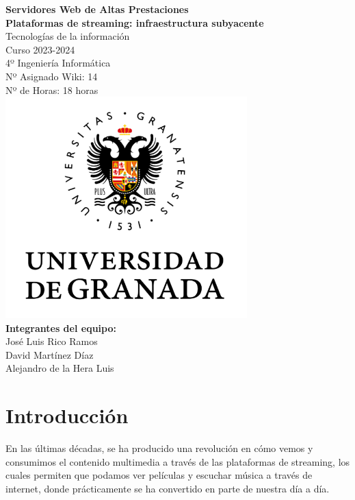 \documentclass[12pt,a4paper]{article}
\begin{document}
\begin{titlepage}
    \centering
    {\huge \textbf{Servidores Web de Altas Prestaciones}}\\[0.5cm]
    {\huge \textbf{Plataformas de streaming: infraestructura subyacente}}\\[0.5cm]
    {\large Tecnologías de la información}\\[0.2cm]
    Curso 2023-2024\\
    4º Ingeniería Informática\\[0.6cm]
    Nº Asignado Wiki: 14 \\[0.2cm]
    Nº de Horas: 18 horas \\[0.2cm]

    \includegraphics[width=0.7\textwidth]{./img/logo.png}\\[1cm] %
    {\Large \textbf{Integrantes del equipo:}}\\[0.5cm]
    José Luis Rico Ramos\\
    David Martínez Díaz\\
    Alejandro de la Hera Luis\\[2cm]
\end{titlepage}

\tableofcontents
\newpage

\listoffigures
\newpage

\section{Introducción}

En las últimas décadas, se ha producido una revolución en cómo vemos y consumimos el contenido multimedia a través de las plataformas de streaming, los cuales permiten que podamos ver películas y escuchar música a través de internet, donde prácticamente se ha convertido en parte de nuestra día a día.
\end{document}
